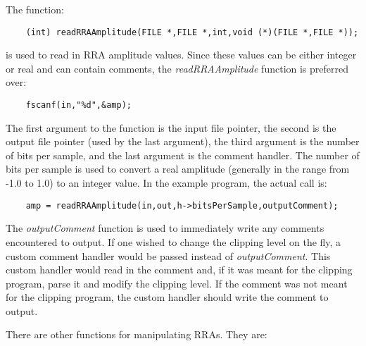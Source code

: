 \documentclass{article}
\begin{document}
The function:

\begin{verbatim}
    (int) readRRAAmplitude(FILE *,FILE *,int,void (*)(FILE *,FILE *));
\end{verbatim}

is used to read in RRA amplitude values. Since these values can be either
integer or real and can contain comments, the {\it readRRAAmplitude} function
is preferred over:

\begin{verbatim}
    fscanf(in,"%d",&amp);
\end{verbatim}

The first argument to the function is the input file pointer, the second
is the output file pointer (used by the last argument), the third argument
is the number of bits per sample, and the last argument is the comment
handler. The number of bits per sample is used to convert a
real amplitude (generally in the range from -1.0 to 1.0) to an
integer value. In the example program, the actual call is:

\begin{verbatim}
    amp = readRRAAmplitude(in,out,h->bitsPerSample,outputComment);
\end{verbatim}

The {\it outputComment} function is used to immediately write any comments
encountered to output. If one wished to change the clipping level
on the fly, a custom comment handler would be passed instead of
{\it outputComment}. This custom handler would read in the comment and,
if it was meant for the clipping program, parse it and modify the
clipping level. If the comment was not meant for the clipping program,
the custom handler should write the comment to output.

There are other functions for manipulating RRAs. They are:
\end{document}
